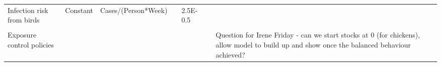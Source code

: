 \begin{landscape}
\begin{longtable}[c]{m{10em}lllm{15em}lll}
Infection risk from birds                     & Constant & Cases/(Person*Week)      &                           & 2.5E-0.5                                                                                                                                                                                                                                                                                 &                                                                                                                                                                                              &                                                                                                                                                                                                                                       \\
                                              &          &                          &                           &                                                                                                                                                                                                                                                                                          &                                                                                                                                                                                              &                                                                                                                                                                                                                                       \\
Exposure control policies                     &          &                          &                           &                                                                                                                                                                                                                                                                                          &                                                                                                                                                                                              & Question for Irene Friday - can we start stocks at 0 (for chickens), allow model to build up and show once the balanced behaviour achieved?                                                                                           \\

\end{longtable}
\end{landscape}
